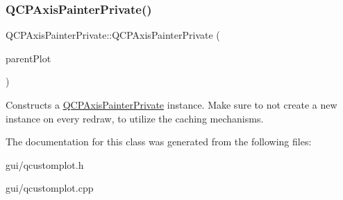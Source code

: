 \subsubsection{\texorpdfstring{Q\+C\+P\+Axis\+Painter\+Private()}{QCPAxisPainterPrivate()}}
{\footnotesize\ttfamily Q\+C\+P\+Axis\+Painter\+Private\+::\+Q\+C\+P\+Axis\+Painter\+Private (\begin{DoxyParamCaption}\item[{\hyperlink{classQCustomPlot}{Q\+Custom\+Plot} $\ast$}]{parent\+Plot }\end{DoxyParamCaption})\hspace{0.3cm}{\ttfamily [explicit]}}

Constructs a \hyperlink{classQCPAxisPainterPrivate}{Q\+C\+P\+Axis\+Painter\+Private} instance. Make sure to not create a new instance on every redraw, to utilize the caching mechanisms. 

The documentation for this class was generated from the following files\+:\begin{DoxyCompactItemize}
\item 
gui/qcustomplot.\+h\item 
gui/qcustomplot.\+cpp\end{DoxyCompactItemize}
